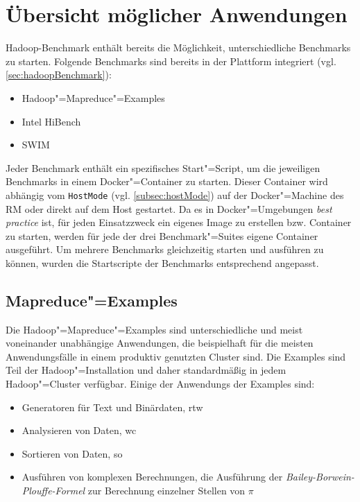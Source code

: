 \section{Übersicht möglicher Anwendungen}
\label{sec:appOverview}

Hadoop-Benchmark enthält bereits die Möglichkeit, unterschiedliche Benchmarks zu starten.
Folgende Benchmarks sind bereits in der Plattform integriert (vgl. \cref{sec:hadoopBenchmark}):

\begin{itemize}
    \item Hadoop"=Mapreduce"=Examples
    \item Intel HiBench
    \item \gls{SWIM}
\end{itemize}

Jeder Benchmark enthält ein spezifisches Start"=Script, um die jeweiligen Benchmarks in einem Docker"=Container zu starten.
Dieser \gls{Container} wird abhängig vom \texttt{HostMode} (vgl. \cref{subsec:hostMode}) auf der Docker"=Machine des \gls{RM} oder direkt auf dem Host gestartet.
Da es in Docker"=Umgebungen \emph{best practice} ist, für jeden Einsatzzweck ein eigenes Image zu erstellen bzw. \gls{Container} zu starten, werden für jede der drei Benchmark"=Suites eigene \gls{Container} ausgeführt.
Um mehrere Benchmarks gleichzeitig starten und ausführen zu können, wurden die Startscripte der Benchmarks entsprechend angepasst.

\subsection{Mapreduce"=Examples}
\label{subsec:mapreduceExamples}

Die Hadoop"=Mapreduce"=Examples sind unterschiedliche und meist voneinander unabhängige Anwendungen, die beispielhaft für die meisten Anwendungsfälle in einem produktiv genutzten Cluster sind.
Die Examples sind Teil der Hadoop"=Installation und daher standardmäßig in jedem Hadoop"=Cluster verfügbar.
Einige der \glspl{Anwendung} der Examples sind:

\begin{itemize}
    \item Generatoren für Text und Binärdaten, \zB \acrlong{rtw}
    \item Analysieren von Daten, \zB \acrlong{wc}
    \item Sortieren von Daten, \zB \acrlong{so}
    \item Ausführen von komplexen Berechnungen, \zB die Ausführung der \emph{Bailey-Borwein-Plouffe-Formel} \cite{Bailey1997} zur Berechnung einzelner Stellen von $\pi$
\end{itemize}

